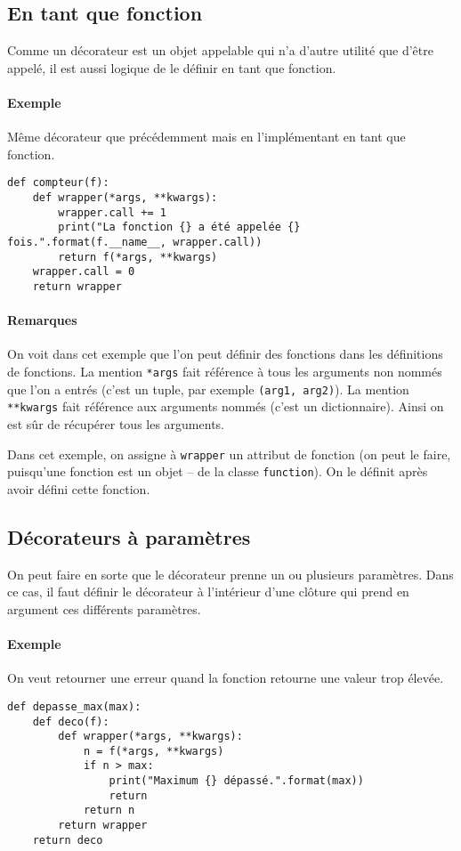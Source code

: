 \subsection{En tant que fonction}
Comme un décorateur est un objet appelable qui n'a d'autre utilité que d'être appelé, il est aussi logique de le définir en tant que fonction.

\paragraph{Exemple} Même décorateur que précédemment mais en l'implémentant en tant que fonction.
\begin{verbatim}
def compteur(f):
    def wrapper(*args, **kwargs):
        wrapper.call += 1
        print("La fonction {} a été appelée {} fois.".format(f.__name__, wrapper.call))
        return f(*args, **kwargs)
    wrapper.call = 0
    return wrapper
\end{verbatim}

\paragraph{Remarques} On voit dans cet exemple que l'on peut définir des fonctions dans les définitions de fonctions. La mention \texttt{*args} fait référence à tous les arguments non nommés que l'on a entrés (c'est un tuple, par exemple \texttt{(arg1, arg2)}). La mention \texttt{**kwargs} fait référence aux arguments nommés (c'est un dictionnaire). Ainsi on est sûr de récupérer tous les arguments.\bigskip

Dans cet exemple, on assigne à \texttt{wrapper} un attribut de fonction (on peut le faire, puisqu'une fonction est un objet -- de la classe \texttt{function}). On le définit après avoir défini cette fonction.

\subsection{Décorateurs à paramètres}
On peut faire en sorte que le décorateur prenne un ou plusieurs paramètres. Dans ce cas, il faut définir le décorateur à l'intérieur d'une clôture qui prend en argument ces différents paramètres.

\paragraph{Exemple} On veut retourner une erreur quand la fonction retourne une valeur trop élevée.
\begin{verbatim}
def depasse_max(max):
    def deco(f):
        def wrapper(*args, **kwargs):
            n = f(*args, **kwargs)
            if n > max:
                print("Maximum {} dépassé.".format(max))
                return
            return n
        return wrapper
    return deco
\end{verbatim}

